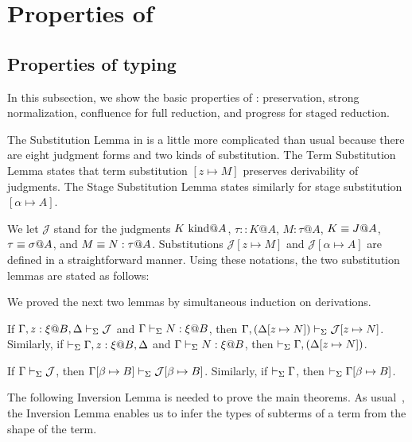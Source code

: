 
\section{Properties of \LMD \label{sec:properties}}

\subsection{Properties of typing}

In this subsection, we show the basic properties of \LMD: preservation, strong
normalization, confluence for full reduction, and progress for staged
reduction.


The Substitution Lemma in \LMD{} is a little more complicated than usual
because there are eight judgment forms and two kinds of substitution.
The Term Substitution Lemma states that term substitution $[z \mapsto M]$
preserves derivability of judgments. The Stage Substitution Lemma
states similarly for stage substitution $[\alpha\mapsto A]$.

We let $\mathcal{J}$ stand for the judgments $K \text{\ kind} @A$, $\tau::K@A$,
$M:\tau@A$, $K \equiv J @ A$, $\tau \equiv \sigma @ A$, and
$M \equiv N : \tau @ A$.  Substitutions $\mathcal{J}[z \mapsto M]$ and
$\mathcal{J}[\alpha \mapsto A]$ are defined in a straightforward
manner.  Using these notations, the two substitution lemmas are stated as follows:

We proved the next two lemmas by simultaneous induction on derivations.

\begin{lemma}
    \label{lemma:TermSubstitution}
    If $\G, z:\xi@B, \D \V \mathcal{J}$ and $\Gamma\vdash_\Sigma N:\xi @B$, then $\Gamma, (\Delta[z \mapsto N]) \vdash_\Sigma \mathcal{J}[z \mapsto N]$.  Similarly, if $\V \G, z:\xi@B, \D$ and
    $\Gamma\vdash_\Sigma N:\xi @B$, then $\vdash_\Sigma \Gamma, (\Delta[z \mapsto N])$.
\end{lemma}

\begin{lemma}
    \label{lemma:StageSubstitution}
    If $\Gamma \vdash_\Sigma \mathcal{J}$, then $\Gamma[\beta\mapsto B] \vdash_\Sigma \mathcal{J}[\beta\mapsto B]$.  Similarly, if $\vdash_\Sigma \Gamma$, then $\vdash_\Sigma \Gamma[\beta\mapsto B]$.
\end{lemma}


The following Inversion Lemma is needed to prove the main theorems.
As usual~\cite{TAPL}, the Inversion Lemma enables us to infer the types of subterms of a term from the shape of the term.

